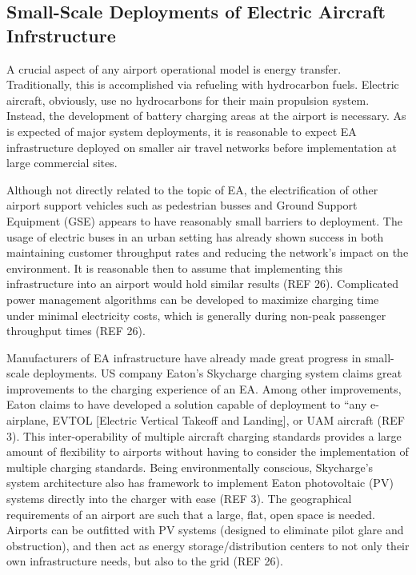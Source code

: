 \documentclass{article}
\begin{document}
\subsection{Small-Scale Deployments of Electric Aircraft Infrstructure}
A crucial aspect of any airport operational model is energy transfer. Traditionally, this is accomplished via refueling with hydrocarbon fuels. Electric aircraft, obviously, use no hydrocarbons for their main propulsion system. Instead, the development of battery charging areas at the airport is necessary. As is expected of major system deployments, it is reasonable to expect EA infrastructure deployed on smaller air travel networks before implementation at large commercial sites.\par
Although not directly related to the topic of EA, the electrification of other airport support vehicles such as pedestrian busses and Ground Support Equipment (GSE) appears to have reasonably small barriers to deployment. The usage of electric buses in an urban setting has already shown success in both maintaining customer throughput rates and reducing the network’s impact on the environment.  It is reasonable then to assume that implementing this infrastructure into an airport would hold similar results (REF 26). Complicated power management algorithms can be developed to maximize charging time under minimal electricity costs, which is generally during non-peak passenger throughput times (REF 26).\par
Manufacturers of EA infrastructure have already made great progress in small-scale deployments. US company Eaton’s Skycharge charging system claims great improvements to the charging experience of an EA. Among other improvements,  Eaton claims to have developed a solution capable of deployment to “any e-airplane, EVTOL [Electric Vertical Takeoff and Landing], or UAM aircraft (REF 3). This inter-operability of multiple aircraft charging standards provides a large amount of flexibility to airports without having to consider the implementation of multiple charging standards. Being environmentally conscious, Skycharge’s system architecture also has framework to implement Eaton photovoltaic (PV) systems directly into the charger with ease (REF 3). The geographical requirements of an airport are such that a large, flat, open space is needed. Airports can be outfitted with PV systems (designed to eliminate pilot glare and obstruction), and then act as energy storage/distribution centers to not only their own infrastructure needs, but also to the grid (REF 26).\par
\end{document}
